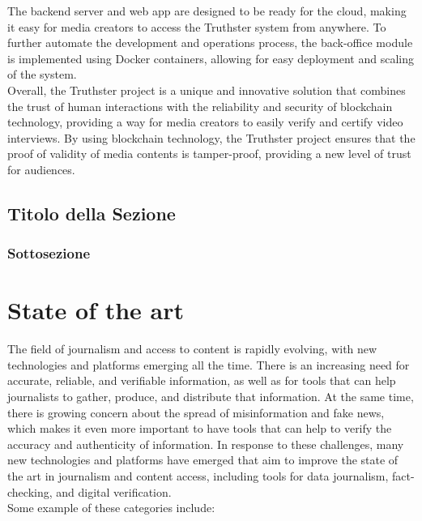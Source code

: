 \documentclass[target=mst,aauheader=]{thud}
\begin{document}
The backend server and web app are designed to be ready for the cloud, making it easy for media creators to access the Truthster system from anywhere. To further automate the development and operations process, the back-office module is implemented using Docker containers, allowing for easy deployment and scaling of the system.\\

Overall, the Truthster project is a unique and innovative solution that combines the trust of human interactions with the reliability and security of blockchain technology, providing a way for media creators to easily verify and certify video interviews. By using blockchain technology, the Truthster project ensures that the proof of validity of media contents is tamper-proof, providing a new level of trust for audiences.

\section{Titolo della Sezione}

\subsection{Sottosezione}





\chapter{State of the art}

The field of journalism and access to content is rapidly evolving, with new technologies and platforms emerging all the time. There is an increasing need for accurate, reliable, and verifiable information, as well as for tools that can help journalists to gather, produce, and distribute that information. At the same time, there is growing concern about the spread of misinformation and fake news, which makes it even more important to have tools that can help to verify the accuracy and authenticity of information. In response to these challenges, many new technologies and platforms have emerged that aim to improve the state of the art in journalism and content access, including tools for data journalism, fact-checking, and digital verification.\\
Some example of these categories include:
\end{document}
